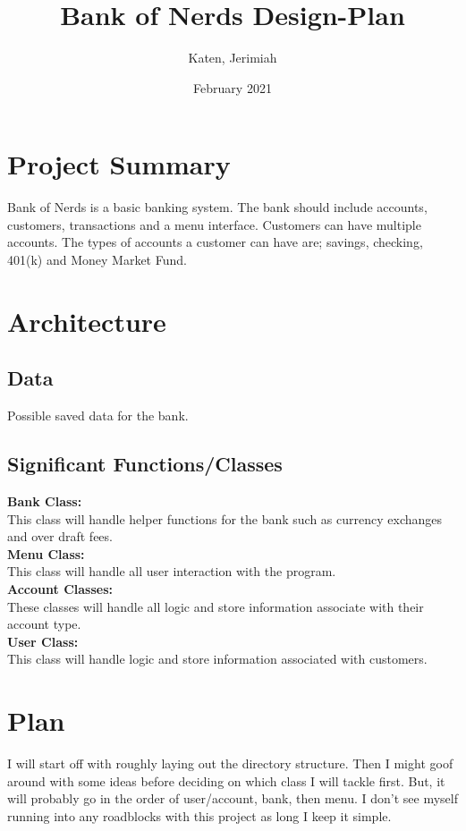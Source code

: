 \documentclass{article}
\title{Bank of Nerds Design-Plan}
\author{Katen, Jerimiah}
\date{February 2021}
\begin{document}
\maketitle

\section{Project Summary}

Bank of Nerds is a basic banking system. The bank should include accounts, customers, transactions and a menu interface. Customers can have multiple accounts. The types of accounts a customer can have are; savings, checking, 401(k) and Money Market Fund.

\section{Architecture}

\subsection{Data}

Possible saved data for the bank.

\subsection{Significant Functions/Classes}

\textbf{Bank Class:}
\\[.5cm]
This class will handle helper functions for the bank such as currency exchanges and over draft fees.
\\[.5cm]
\textbf{Menu Class:}
\\[.5cm]
This class will handle all user interaction with the program.
\\[.5cm]
\textbf{Account Classes:}
\\[.5cm]
These classes will handle all logic and store information associate with their account type.
\\[.5cm]
\textbf{User Class:}
\\[.5cm]
This class will handle logic and store information associated with customers.

\section{Plan}
I will start off with roughly laying out the directory structure. Then I might goof around with some ideas before deciding on which class I will tackle first. But, it will probably go in the order of user/account, bank, then menu. I don't see myself running into any roadblocks with this project as long I keep it simple.
\end{document}
